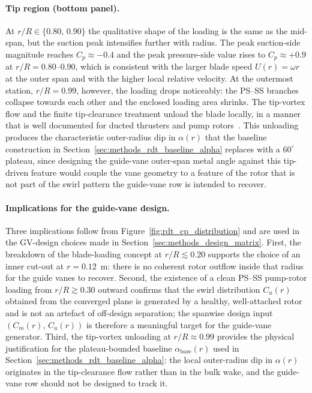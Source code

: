 \paragraph{Tip region (bottom panel).}
At $r/R\in\{0.80,\,0.90\}$ the qualitative shape of the loading is the
same as the mid-span, but the suction peak intensifies further with
radius. The peak suction-side magnitude reaches $C_p\approx -0.4$ and
the peak pressure-side value rises to $C_p\approx +0.9$ at
$r/R=0.80$--$0.90$, which is consistent with the larger blade speed
$U(r)=\omega r$ at the outer span and with the higher local relative
velocity. At the outermost station, $r/R=0.99$, however, the loading
drops noticeably: the PS--SS branches collapse towards each other and
the enclosed loading area shrinks. The tip-vortex flow and the
finite tip-clearance treatment unload the blade locally, in a manner
that is well documented for ducted thrusters and pump
rotors~\cite{Verdijck2025}. This unloading produces the
characteristic outer-radius dip in $\alpha(r)$ that the baseline
construction in
Section~\ref{sec:methods_rdt_baseline_alpha} replaces with a
$60^\circ$ plateau, since designing the guide-vane outer-span metal
angle against this tip-driven feature would couple the vane geometry
to a feature of the rotor that is not part of the swirl pattern the
guide-vane row is intended to recover.
 
\paragraph{Implications for the guide-vane design.}
Three implications follow from Figure~\ref{fig:rdt_cp_distribution} and
are used in the GV-design choices made in
Section~\ref{sec:methods_design_matrix}. First, the breakdown of the
blade-loading concept at $r/R\lesssim 0.20$ supports the choice of an
inner cut-out at $r=0.12$~m: there is no coherent rotor outflow inside
that radius for the guide vanes to recover. Second, the existence of a
clean PS--SS pump-rotor loading from $r/R\gtrsim 0.30$ outward confirms
that the swirl distribution $C_u(r)$ obtained from the converged plane
is generated by a healthy, well-attached rotor and is not an artefact
of off-design separation; the spanwise design input
$(C_m(r),\,C_u(r))$ is therefore a meaningful target for the guide-vane
generator. Third, the tip-vortex unloading at $r/R\approx 0.99$
provides the physical justification for the plateau-bounded baseline
$\alpha_{\mathrm{base}}(r)$ used in
Section~\ref{sec:methods_rdt_baseline_alpha}: the local outer-radius
dip in $\alpha(r)$ originates in the tip-clearance flow rather than in
the bulk wake, and the guide-vane row should not be designed to track
it.








